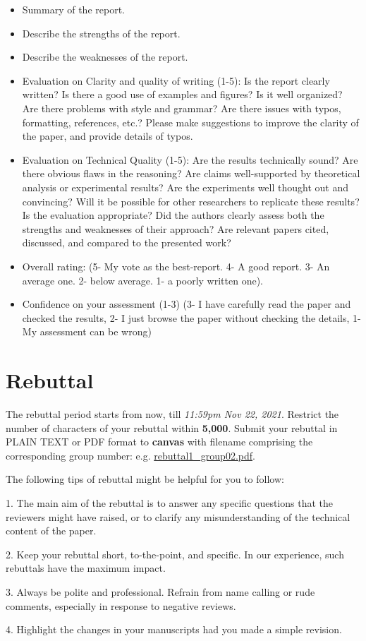 \documentclass[11pt]{article}
\begin{document}
\begin{itemize}
\item Summary of the report.
\item Describe the strengths of the report. 
\item Describe the weaknesses of the report.
\item Evaluation on Clarity and quality of writing (1-5): Is the report clearly written? Is there a good use of examples and figures? Is it well organized? Are there problems with style and grammar? Are there issues with typos, formatting, references, etc.? Please make suggestions to improve the clarity of the paper, and provide details of typos.
\item Evaluation on Technical Quality (1-5): Are the results technically sound? Are there obvious flaws in the reasoning? Are claims well-supported by theoretical analysis or experimental results? Are the experiments well thought out and convincing? Will it be possible for other researchers to replicate these results? Is the evaluation appropriate? Did the authors clearly assess both the strengths and weaknesses of their approach? Are relevant papers cited, discussed, and compared to the presented work?
\item Overall rating: (5- My vote as the best-report. 4- A good report. 3- An average one. 2- below average. 1- a poorly written one). 
\item Confidence on your assessment (1-3)
(3- I have carefully read the paper and checked the results, 2- I just browse the paper without checking the details, 1- My assessment can be wrong)
\end{itemize}
%
%
\newpage

\section*{Rebuttal}
The rebuttal period starts from now, till \emph{11:59pm Nov 22, 2021}. Restrict the number of characters of your rebuttal within {\bf{5,000}}. Submit your rebuttal in PLAIN TEXT or PDF format to \textbf{canvas} with filename comprising the corresponding group number: e.g. \underline{rebuttal1\_group02.pdf}. %

The following tips of rebuttal might be helpful for you to follow:

1. The main aim of the rebuttal is to answer any specific questions that the reviewers might have raised, or to clarify any misunderstanding of the technical content of the paper.

2. Keep your rebuttal short, to-the-point, and specific. In our experience, such rebuttals have the maximum impact.

3. Always be polite and professional. Refrain from name calling or rude comments, especially in response to negative reviews.

4. Highlight the changes in your manuscripts had you made a simple revision.

%
\end{document}

